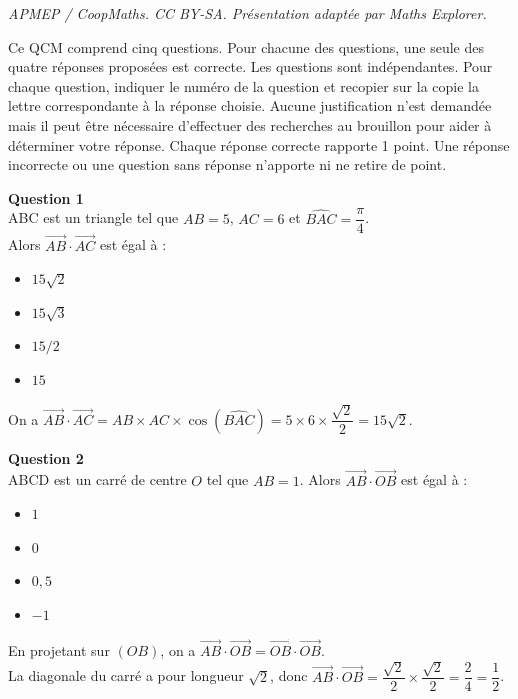 \documentclass[10pt]{article}
\begin{document}
\noindent\textit{APMEP / CoopMaths. CC BY-SA. Présentation adaptée par Maths Explorer.}\par\medskip
Ce QCM comprend cinq questions. Pour chacune des questions, une seule des quatre réponses proposées est correcte. Les questions sont indépendantes. Pour chaque question, indiquer le numéro de la question et recopier sur la copie la lettre correspondante à la réponse choisie. Aucune justification n’est demandée mais il peut être nécessaire d’effectuer des recherches au brouillon pour aider à déterminer votre réponse. Chaque réponse correcte rapporte 1 point. Une réponse incorrecte ou une question sans réponse n’apporte ni ne retire de point.
	
\textbf{	Question 1}\\
	ABC est un triangle tel que $AB = 5$, $AC = 6$ et $\widehat{ BAC} = \dfrac{\pi}{4}$.\\
	 Alors $\overrightarrow{AB} \cdot \overrightarrow{AC}$ est égal à :
	
	\begin{itemize}
		\item[a.] $15\sqrt{2}$
		\item[b.] $15\sqrt{3}$
		\item[c.] $15/2$
		\item[d.] $15$
	\end{itemize}
	
	On a $\overrightarrow{AB} \cdot \overrightarrow{AC} = AB \times AC \times \cos(\widehat{ BAC}) = 5 \times 6 \times \dfrac{\sqrt{2}}{2} = 15\sqrt{2}$.
	
\textbf{	Question 2}\\
	ABCD est un carré de centre $O$ tel que $AB = 1$. Alors $\overrightarrow{AB} \cdot \overrightarrow{OB}$ est égal à :
	
	\begin{itemize}
		\item[a.] $1$
		\item[b.] $0$
		\item[c.] $0,5$
		\item[d.] $-1$
	\end{itemize}
	
	En projetant sur $(OB)$, on a $\overrightarrow{AB} \cdot \overrightarrow{OB} = \overrightarrow{OB} \cdot \overrightarrow{OB}$. \\
	La diagonale du carré a pour longueur $\sqrt{2}$, donc $\overrightarrow{AB} \cdot \overrightarrow{OB} = \dfrac{\sqrt{2}}{2} \times \dfrac{\sqrt{2}}{2} = \dfrac{2}{4} = \dfrac{1}{2}$.
	
\end{document}
